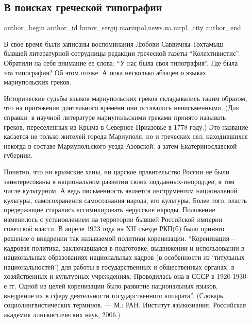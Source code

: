  
 
 
 
 
 
\subsection{В поисках греческой типографии}
\label{sec:19_08_2017.stz.news.ua.mrpl_city.1.v_poiskah_grecheskoj_tipografii}
 
\ifcmt
 author_begin
   author_id burov_sergij.mariupol,news.ua.mrpl_city
 author_end
\fi


В свое время были записаны воспоминания Любови Саввичны Тохтамыш – бывшей
литературной сотрудницы редакции греческой газеты \enquote{Колехтивистис}. Обратили на
себя внимание ее слова: \enquote{У нас была своя типография}. Где была эта типография?
Об этом позже. А пока несколько абзацев о языках мариупольских греков.


Исторические судьбы языков мариупольских греков складывались таким образом, что
на протяжении длительного времени они оставались неписьменными. (Для справки: в
научной литературе  мариупольскими греками принято называть греков,
переселенных из Крыма в Северное Приазовье в 1778 году.) Это название  касается
не только жителей города Мариуполя, но и греческих сел, находившихся некогда в
составе Мариупольского уезда Азовской, а затем Екатеринославской губернии.

Понятно, что ни крымские ханы, ни царское правительство России не были
заинтересованы в национальном развитии своих подданных-инородцев, в том числе
культурном. А ведь письменность является инструментом национальной культуры,
самосохранения самосознания  народа, его культуры. Более того, власть
предержащие старались ассимилировать нерусские народы. Положение изменилось с
установлением на территории  бывшей Российской империи советской власти. В
апреле 1923 года на XII съезде РКП(б) было принято решение о внедрении так
называемой политики коренизации. \enquote{Коренизация – кадровая политика,
заключавшаяся в подготовке, выдвижении и использовании в национальных
образованиях национальных кадров (в особенности из \enquote{титульных национальностей})
для работы в государственных и общественных органах, в хозяйственных и
культурных учреждениях. Проводилась она в СССР в 1920-1930-е гг. Одной из целей
коренизации было развитие национальных языков, внедрение их в сферу
деятельности государственного аппарата}. (Словарь социолингвистических
терминов. — М.: РАН. Институт языкознания. Российская академия лингвистических
наук, 2006.)

